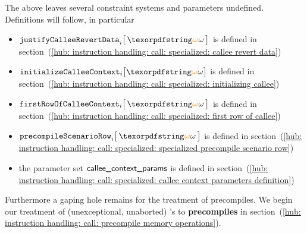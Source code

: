 The above leaves several constraint systems and parameters undefined. Definitions will follow, in particular
\begin{itemize}
	\item $\justifyCalleeRevertData       {i}{\relof}$            is defined in section~(\ref{hub: instruction handling: call: specialized: callee revert data})
	\item $\initializeCalleeContextName  _{i} \big[ \relof \big]$ is defined in section~(\ref{hub: instruction handling: call: specialized: initializing callee})
	\item $\firstRowOfCallee              {i}{\relof}$            is defined in section~(\ref{hub: instruction handling: call: specialized: first row of callee})
	\item $\precompileScenarioRow         {i}{\relof}$            is defined in section~(\ref{hub: instruction handling: call: specialized: specialized precompile scenario row})
	\item the parameter set $\textsf{callee\_context\_params}$ is defined in section~(\ref{hub: instruction handling: call: specialized: callee context parameters definition})
\end{itemize}
Furthermore a gaping hole remains for the treatment of precompiles.
We begin our treatment of (unexceptional, unaborted) 's to \textbf{precompiles} in section~(\ref{hub: instruction handling: call: precompile memory operations}).
